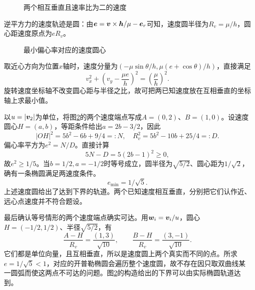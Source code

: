 \begin{figure}[H]\centering
{}
\caption{两个相互垂直且速率比为二的速度}\label{fig:hw8-6-q}
\end{figure}

\begin{solution}
逆平方力的速度轨迹是圆：由$\bm{e}=\bm{v}\times\bm{h}/\mu-\bm{e}_r$可知，速度圆半径为$R_v=\mu/h$，圆心距速度原点为$eR_v$。

\begin{figure}[H]\centering
{}
\caption{最小偏心率对应的速度圆心}\label{fig:hw8-6-s}
\end{figure}

取近心方向为位置$x$轴时，速度分量为$(-\mu\sin\theta/h,\mu(e+\cos\theta)/h)$，直接满足
\[
 v_x^2+\left(v_y-\frac{\mu e}{h}\right)^2=
 \left(\frac\mu h\right)^2.
\]
旋转速度坐标轴不改变圆心距与半径之比，故可把两已知速度放在互相垂直的坐标轴上求最小值。

以$u=|\bm{v}_2|$为单位，将图\ref{fig:hw8-6-s}的两个速度端点写成$A=(0,2)$、$B=(1,0)$。设速度圆心$H=(a,b)$，等距条件给出$a=2b-3/2$，因此
\[
 |OH|^2=5b^2-6b+9/4=:N,\quad
 R_v^2=5b^2-10b+25/4=:D.
\]
偏心率平方为$e^2=N/D$。直接计算
\[
 5N-D=5(2b-1)^2\ge0,
\]
故$e^2\ge1/5$。当$b=1/2,a=-1/2$时等号成立，圆半径为$\sqrt{5/2}$、圆心距为$1/\sqrt2$，确有一条椭圆满足两速度条件。
\[
 \boxed{e_{\min}=1/\sqrt5}.
\]
上述速度圆给出了达到下界的轨道。两个已知速度相互垂直，分别把它们认作近、远心点速度并不符合题设。


最后确认等号情形的两个速度端点确实可达。用$\bm{w}_i=\bm{v}_i/u$，圆心$H=(-1/2,1/2)$、半径$\sqrt{5/2}$，有
\[
 \frac{A-H}{R_v}=\frac{(1,3)}{\sqrt{10}},\qquad
 \frac{B-H}{R_v}=\frac{(3,-1)}{\sqrt{10}}.
\]
它们都是单位向量，且互相垂直，所以是速度圆上两个真实而不同的点。所求$e=1/\sqrt5<1$，对应的开普勒椭圆会遍历整个速度圆，故不存在因只取双曲线某一圆弧而使这两点不可达的问题。图\ref{fig:hw8-6-s}的构造给出的下界可以由实际椭圆轨道达到。

\end{solution}



